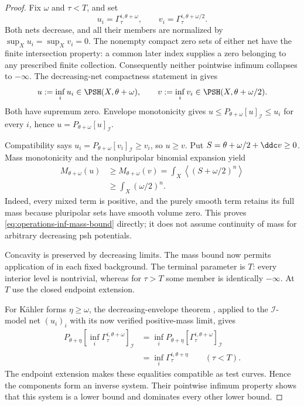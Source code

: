 \begin{proof}
Fix $\omega$ and $\tau<T$, and set
\[
 u_i=\Gamma_\tau^{i,\theta+\omega},
 \qquad
 v_i=\Gamma_\tau^{i,\theta+\omega/2}.
\]
Both nets decrease, and all their members are normalized by
$\sup_X u_i=\sup_X v_i=0$.
The nonempty compact zero sets of either net have the finite
intersection property: a common later index supplies a zero
belonging to any prescribed finite collection.
Consequently neither pointwise infimum collapses to $-\infty$.
The decreasing-net compactness statement in
 gives
\[
 u:=\inf_i u_i\in\PSH(X,\theta+\omega),\qquad
 v:=\inf_i v_i\in\PSH(X,\theta+\omega/2).
\]
Both have supremum zero. Envelope monotonicity gives
$u\leq P_{\theta+\omega}[u]_{\mathcal I}\leq u_i$
for every $i$, hence $u=P_{\theta+\omega}[u]_{\mathcal I}$.

Compatibility says
$u_i=P_{\theta+\omega}[v_i]_{\mathcal I}\geq v_i$,
so $u\geq v$.
Put $S=\theta+\omega/2+\ddc v\geq0$.
Mass monotonicity and the nonpluripolar binomial expansion yield
\[
 \begin{split}
 M_{\theta+\omega}(u)
 &\geq M_{\theta+\omega}(v)
   =\int_X\left\langle(S+\omega/2)^n\right\rangle\\
 &\geq\int_X(\omega/2)^n.
 \end{split}
\]
Indeed, every mixed term is positive, and the purely smooth term
retains its full mass because pluripolar sets have smooth volume
zero. This proves \eqref{eq:operations-inf-mass-bound} directly;
it does not assume continuity of mass for arbitrary decreasing
psh potentials.

Concavity is preserved by decreasing limits.
The mass bound now permits application of
 in each fixed background.
The terminal parameter is $T$: every interior level is nontrivial,
whereas for $\tau>T$ some member is identically $-\infty$.
At $T$ use the closed endpoint extension.

For K\"ahler forms $\eta\geq\omega$, the decreasing-envelope
theorem \cite[Proposition~2.8]{XiaOperationsV3}, applied to the
$\mathcal I$-model net $(u_i)_i$ with its now verified positive-mass
limit, gives
\[
 \begin{split}
 P_{\theta+\eta}
       \left[\inf_i\Gamma_\tau^{i,\theta+\omega}\right]_{\mathcal I}
 &=\inf_iP_{\theta+\eta}
       [\Gamma_\tau^{i,\theta+\omega}]_{\mathcal I}\\
 &=\inf_i\Gamma_\tau^{i,\theta+\eta}
 \qquad(\tau<T).
 \end{split}
\tag{54.12}\label{eq:operations-inf-transition}
\]
The endpoint extension makes these equalities compatible as
test curves. Hence the components form an inverse system.
Their pointwise infimum property shows that this system is a
lower bound and dominates every other lower bound.
\end{proof}


